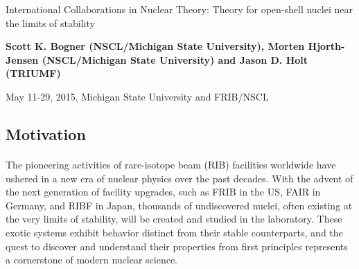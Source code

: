 \documentclass[%
twoside,                 %
final,                   %
10pt]{article}
\begin{document}






\thispagestyle{empty}

\begin{center}
{\LARGE\bf
\begin{spacing}{1.25}
International Collaborations in Nuclear Theory: Theory for open-shell nuclei near the limits of stability
\end{spacing}
}
\end{center}


\begin{center}
{\bf Scott K. Bogner (NSCL/Michigan State University), Morten Hjorth-Jensen (NSCL/Michigan State University) and Jason D. Holt (TRIUMF)${}^{}$} \\ [0mm]
\end{center}

    \begin{center}
\end{center}
    


\begin{center} %
May 11-29, 2015, Michigan State University and FRIB/NSCL
\end{center}

\vspace{1cm}


\subsection{Motivation}


\paragraph{}


The pioneering activities of rare-isotope beam (RIB) facilities worldwide have 
ushered in a new era of nuclear physics over the past decades. With the advent of 
the next generation of facility upgrades, such as FRIB in the US, FAIR in Germany, 
and RIBF in Japan, thousands of undiscovered nuclei, often existing at the very 
limits of stability, will be created and studied in the laboratory. These exotic 
systems exhibit behavior distinct from their stable counterparts, and the quest to 
discover and understand their properties from first principles represents a 
cornerstone of modern nuclear science.
\end{document}
